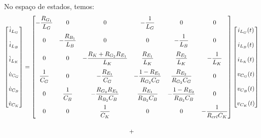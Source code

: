 \documentclass{article}
\newcommand{\ds}{\displaystyle}
\begin{document}
No espaço de estados, temos:
\begin{gather}
  \begin{bmatrix}
    \dot{i}_{L_G} \\[12pt] \dot{i}_{L_B} \\[12pt] \dot{i}_{L_K} \\[12pt]
    \dot{v}_{C_G} \\[12pt] \dot{v}_{C_B} \\[12pt] \dot{v}_{C_K}
  \end{bmatrix} =
  \begin{bmatrix}
    \ds - \frac{R_{G_1}}{L_G} & 0                         & 0                                         & \ds - \frac{1}{L_G}                  & 0                                    & 0                           \\[12pt]
    0                         & \ds - \frac{R_{B_1}}{L_B} & 0                                         & 0                                    & \ds - \frac{1}{L_B}                  & 0                           \\[12pt]
    0                         & 0                         & - \ds \frac{R_K + R_{G_2} R_{E_1}}{L_K}   & \ds \frac{R_{E_1}}{L_K}              & \ds \frac{R_{E_2}}{L_K}              & - \ds \frac{1}{L_K}         \\[12pt]
    \ds \frac{1}{C_G}         & 0                         & \ds - \frac{R_{E_1}}{C_G}                 & \ds - \frac{1 - R_{E_1}}{R_{G_2}C_G} & \ds \frac{R_{E_2}}{R_{G_2}C_G}       & 0                           \\[12pt]
    0                         & \ds \frac{1}{C_B}         & \ds - \frac{R_{G_2} R_{E_1}}{R_{B_2} C_B} & \ds \frac{R_{E_1}}{R_{B_2} C_B}      & \ds - \frac{1 - R_{E_2}}{R_{B_2}C_B} & 0                           \\[12pt]
    0                         & 0                         & \ds \frac{1}{C_K}                         & 0                                    & 0                                    & \ds - \frac{1}{R_{crl} C_K}
  \end{bmatrix}
  \begin{bmatrix}
    i_{L_G}(t) \\[12pt] i_{L_B}(t) \\[12pt] i_{L_K}(t) \\[12pt]
    v_{C_G}(t) \\[12pt] v_{C_B}(t) \\[12pt] v_{C_K}(t)
  \end{bmatrix} \notag \\[12pt] +

\end{gather}
\end{document}
